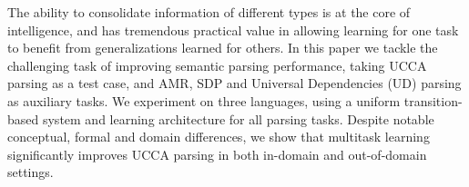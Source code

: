The ability to consolidate information of different types is at the core of intelligence, and has tremendous practical value in allowing learning for one task to benefit from generalizations learned for others.  In this paper we tackle the challenging task of improving semantic parsing performance, taking UCCA parsing as a test case, and AMR, SDP and Universal Dependencies (UD) parsing as auxiliary tasks.  We experiment on three languages, using a uniform transition-based system and learning architecture for all parsing tasks.  Despite notable conceptual, formal and domain differences, we show that multitask learning significantly improves UCCA parsing in both in-domain and out-of-domain settings.
